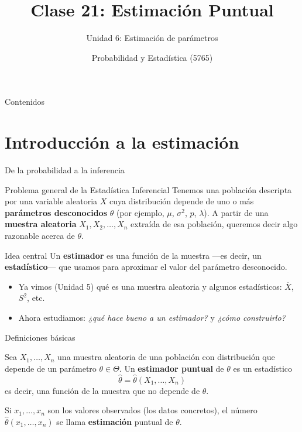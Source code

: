 \documentclass[aspectratio=169,11pt]{beamer}
\title[Prob. y Estadística]{Clase 21: Estimación Puntual}
\subtitle{Unidad 6: Estimación de parámetros}
\institute[UNS]{Universidad Nacional del Sur \\ Departamento de Matemática}
\author{Probabilidad y Estadística (5765)}
\date{}
\begin{document}
\begin{frame}
\titlepage
\end{frame}

\begin{frame}{Contenidos}
\tableofcontents
\end{frame}

\section{Introducción a la estimación}

\begin{frame}{De la probabilidad a la inferencia}
\begin{block}{Problema general de la Estadística Inferencial}
Tenemos una población descripta por una variable aleatoria $X$ cuya distribución depende de uno o más \textbf{parámetros desconocidos} $\theta$ (por ejemplo, $\mu$, $\sigma^2$, $p$, $\lambda$). A partir de una \textbf{muestra aleatoria} $X_1, X_2, \dots, X_n$ extraída de esa población, queremos decir algo razonable acerca de $\theta$.
\end{block}

\begin{alertblock}{Idea central}
Un \textbf{estimador} es una función de la muestra —es decir, un \textbf{estadístico}— que usamos para aproximar el valor del parámetro desconocido.
\end{alertblock}

\begin{itemize}
\item Ya vimos (Unidad 5) qué es una muestra aleatoria y algunos estadísticos: $\overline{X}$, $S^2$, etc.
\item Ahora estudiamos: \emph{¿qué hace bueno a un estimador?} y \emph{¿cómo construirlo?}
\end{itemize}
\end{frame}

\begin{frame}{Definiciones básicas}
\begin{definition}
Sea $X_1,\dots,X_n$ una muestra aleatoria de una población con distribución que depende de un parámetro $\theta \in \Theta$. Un \textbf{estimador puntual} de $\theta$ es un estadístico
\[
\widehat{\theta} = \widehat{\theta}(X_1,\dots,X_n)
\]
es decir, una función de la muestra que no depende de $\theta$.
\end{definition}

\begin{definition}[Estimación]
Si $x_1,\dots,x_n$ son los valores observados (los datos concretos), el número $\widehat{\theta}(x_1,\dots,x_n)$ se llama \textbf{estimación} puntual de $\theta$.
\end{definition}

\end{frame}
\end{document}
